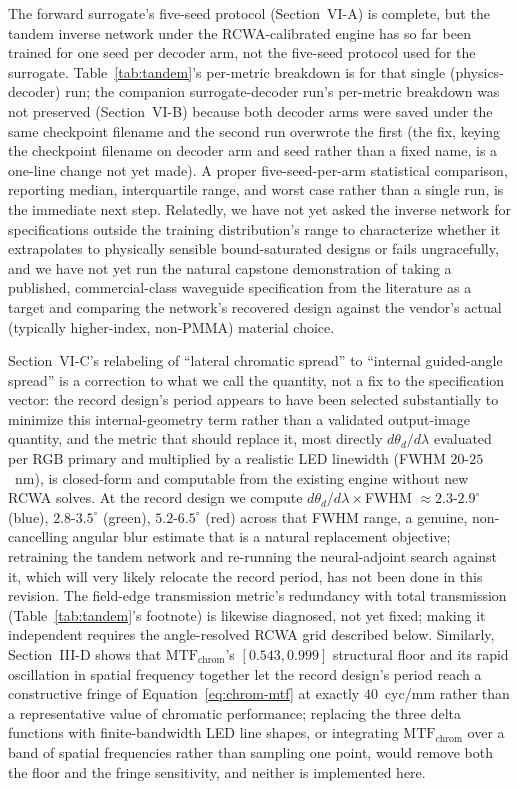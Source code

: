 \documentclass[10pt,twocolumn]{article}
\begin{document}
The forward surrogate's five-seed protocol (Section~VI-A) is complete,
but the tandem inverse network under the RCWA-calibrated engine has so far
been trained for one seed per decoder arm, not the five-seed protocol used
for the surrogate. Table~\ref{tab:tandem}'s per-metric breakdown is for
that single (physics-decoder) run; the companion surrogate-decoder run's
per-metric breakdown was not preserved (Section~VI-B) because both decoder
arms were saved under the same checkpoint filename and the second run
overwrote the first (the fix, keying the checkpoint filename on decoder
arm and seed rather than a fixed name, is a one-line change not yet made).
A proper five-seed-per-arm statistical comparison, reporting median,
interquartile range, and worst case rather than a single run, is the
immediate next step. Relatedly, we have not yet asked the inverse network
for specifications outside the training distribution's range to
characterize whether it extrapolates to physically sensible
bound-saturated designs or fails ungracefully, and we have not yet run the
natural capstone demonstration of taking a published, commercial-class
waveguide specification from the literature as a target and comparing the
network's recovered design against the vendor's actual (typically
higher-index, non-PMMA) material choice.

Section~VI-C's relabeling of ``lateral chromatic spread'' to ``internal
guided-angle spread'' is a correction to what we call the quantity, not a
fix to the specification vector: the record design's period appears to
have been selected substantially to minimize this internal-geometry term
rather than a validated output-image quantity, and the metric that should
replace it, most directly $d\theta_d/d\lambda$ evaluated per RGB primary
and multiplied by a realistic LED linewidth (FWHM $20$-$25$~nm), is
closed-form and computable from the existing engine without new RCWA
solves. At the record design we compute $d\theta_d/d\lambda\times$FWHM
$\approx2.3$-$2.9^\circ$ (blue), $2.8$-$3.5^\circ$ (green),
$5.2$-$6.5^\circ$ (red) across that FWHM range, a genuine, non-cancelling
angular blur estimate that is a natural replacement objective; retraining
the tandem network and re-running the neural-adjoint search against it,
which will very likely relocate the record period, has not been done in
this revision. The field-edge transmission metric's redundancy with total
transmission (Table~\ref{tab:tandem}'s footnote) is likewise diagnosed,
not yet fixed; making it independent requires the angle-resolved RCWA grid
described below. Similarly, Section~III-D shows that
$\mathrm{MTF}_{\mathrm{chrom}}$'s $[0.543,0.999]$ structural floor and its
rapid oscillation in spatial frequency together let the record design's
period reach a constructive fringe of Equation~\eqref{eq:chrom-mtf} at
exactly $40$~cyc/mm rather than a representative value of chromatic
performance; replacing the three delta functions with finite-bandwidth LED
line shapes, or integrating $\mathrm{MTF}_{\mathrm{chrom}}$ over a band of
spatial frequencies rather than sampling one point, would remove both the
floor and the fringe sensitivity, and neither is implemented here.
\end{document}

